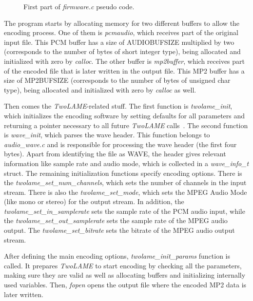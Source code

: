 \begin{figure}[H]
\centerline{}
\caption{First part of \textit{firmware.c} pseudo code.}
\label{pseudo1}
\end{figure}


The program starts by allocating memory for two different buffers to allow the encoding process. One of them is \textit{pcmaudio}, which receives part of the original input file. This PCM buffer has a size of AUDIOBUFSIZE multiplied by two (corresponds to the number of bytes of short integer type), being allocated and initialized with zero by \textit{calloc}. The other buffer is \textit{mp2buffer}, which receives part of the encoded file that is later written in the output file. This MP2 buffer has a size of MP2BUFSIZE (corresponds to the number of bytes of unsigned char type), being allocated and initialized with zero by \textit{calloc} as well.

Then comes the \textit{TwoLAME}-related stuff. The first function is \textit{twolame\_init}, which initializes the encoding software by setting defaults for all parameters and returning a pointer necessary to all future \textit{TwoLAME} calls~\cite{twolameapi}. The second function is \textit{wave\_init}, which parses the wave header. This function belongs to \textit{audio\_wave.c} and is responsible for processing the wave header (the first four bytes). Apart from identifying the file as WAVE, the header gives relevant information like sample rate and audio mode, which is collected in a \textit{wave\_info\_t} struct.
The remaining initialization functions specify encoding options. There is the \textit{twolame\_set\_num\_channels}, which sets the number of channels in the input stream. There is also the \textit{twolame\_set\_mode}, which sets the MPEG Audio Mode (like mono or stereo) for the output stream. In addition, the \textit{twolame\_set\_in\_samplerate} sets the sample rate of the PCM audio input, while the \textit{twolame\_set\_out\_samplerate} sets the sample rate of the MPEG audio output. The \textit{twolame\_set\_bitrate} sets the bitrate of the MPEG audio output stream.

After defining the main encoding options, \textit{twolame\_init\_params} function is called. It prepares \textit{TwoLAME} to start encoding by checking all the parameters, making sure they are valid as well as allocating buffers and initializing internally used variables. Then, \textit{fopen} opens the output file where the encoded MP2 data is later written.


